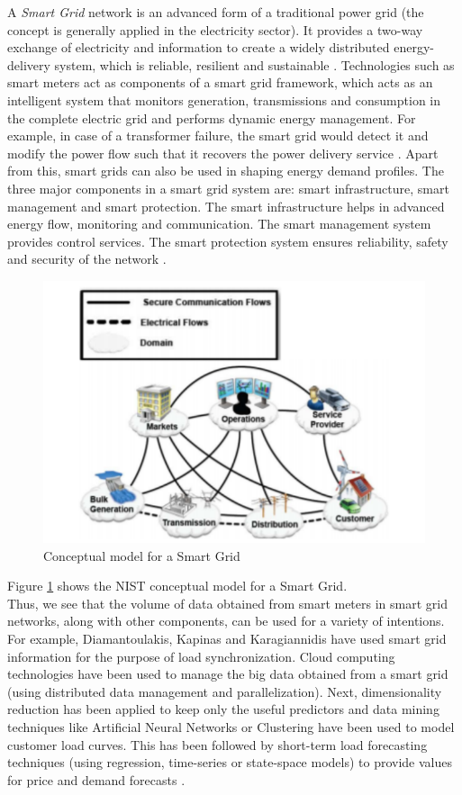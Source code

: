 A {\em Smart Grid} network is an advanced form of a traditional power grid (the concept is generally applied in the electricity sector). It provides a two-way exchange of electricity and information to create a widely distributed energy-delivery system, which is reliable, resilient and sustainable \cite{fang06}. Technologies such as smart meters act as components of a smart grid framework, which acts as an intelligent system that monitors generation, transmissions and consumption in the complete electric grid and performs dynamic energy management. For example, in case of a transformer failure, the smart grid would detect it and modify the power flow such that it recovers the power delivery service \cite{fang06}. Apart from this, smart grids can also be used in shaping energy demand profiles. The three major components in a smart grid system are: smart infrastructure, smart management and smart protection. The smart infrastructure helps in advanced energy flow, monitoring and communication. The smart management system provides control services. The smart protection system ensures reliability, safety and security of the network \cite{fang06}.
\begin{figure}
	\includegraphics[width=1.0\columnwidth]{images/smart_grid.pdf}
	\caption{Conceptual model for a Smart Grid \cite{fang06}}
	\label{F:grid}
\end{figure}
Figure \ref{F:grid} shows the NIST conceptual model for a Smart Grid.\\
Thus, we see that the volume of data obtained from smart meters in smart grid networks, along with other components, can be used for a variety of intentions. For example, Diamantoulakis, Kapinas and Karagiannidis have used smart grid information for the purpose of load synchronization. Cloud computing technologies have been used to manage the big data obtained from a smart grid (using distributed data management and parallelization). Next, dimensionality reduction has been applied to keep only the useful predictors and data mining techniques like Artificial Neural Networks or Clustering have been used to model customer load curves. This has been followed by short-term load forecasting techniques (using regression, time-series or state-space models) to provide values for price and demand forecasts \cite{george07}.
